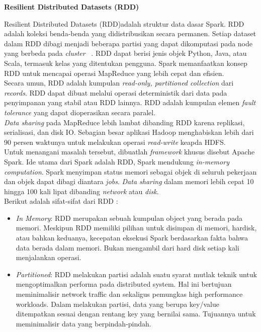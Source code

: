 \documentclass[a4paper,twoside]{article}
\begin{document}
\begin{enumerate}
\begin{itemize}
\end{itemize}

\textbf{Resilient Distributed Datasets (RDD)}

Resilient Distributed Datasets (RDD)adalah struktur data dasar Spark. RDD adalah koleksi benda-benda yang didistribusikan secara permanen. Setiap dataset dalam RDD dibagi menjadi beberapa partisi yang dapat dikomputasi pada node yang berbeda pada \textit{cluster} ~\cite{holdenkarau:02:ls}. RDD dapat berisi jenis objek Python, Java, atau Scala, termasuk kelas yang ditentukan pengguna. Spark memanfaatkan konsep RDD untuk mencapai operasi MapReduce yang lebih cepat dan efisien. \\

Secara umun, RDD adalah kumpulan \textit{read-only, partitioned collection} dari \textit{records}. RDD dapat dibuat melalui operasi deterministik dari data pada penyimpanan yang stabil atau RDD lainnya. RDD adalah kumpulan elemen \textit{fault tolerance} yang dapat dioperasikan secara paralel.\\


\textit{Data sharing} pada MapReduce lebih lambat dibanding RDD  karena replikasi, serialisasi, dan disk IO. Sebagian besar aplikasi Hadoop menghabiskan lebih dari 90 persen waktunya untuk melakukan operasi \textit{read-write} keapda HDFS.\\

Untuk menangani masalah tersebut, dibuatlah \textit{framework} khusus disebut Apache Spark. Ide utama dari Spark adalah RDD, Spark mendukung \textit{in-memory computation}. Spark menyimpan status memori sebagai objek di seluruh pekerjaan dan objek dapat dibagi diantara \textit{jobs}. \textit{Data sharing} dalam memori lebih cepat 10 hingga 100 kali lipat dibanding \textit{network} atau \textit{disk}.\\

Berikut adalah sifat-sifat dari RDD :
\begin{itemize}

\item \textit{In Memory}: RDD merupakan sebuah kumpulan object yang berada pada memori. Meskipun
RDD memiliki pilihan untuk disimpan di memori, hardisk, atau bahkan keduanya, kecepatan
eksekusi Spark berdasarkan fakta bahwa data berada dalam memori. Bukan mengambil dari
hard disk setiap kali menjalankan operasi.

\item \textit{Partitioned}: RDD melakukan partisi adalah suatu syarat mutlak teknik untuk mengoptimalkan
performa pada distributed system. Hal ini bertujuan meminimalisir network traffic dan
sekaligus pemungkas high performance workloads. Dalam melakukan partisi, data yang
berupa key/value ditempatkan sesuai dengan rentang key yang bernilai sama. Tujuannya
untuk meminimalisir data yang berpindah-pindah.


\end{itemize}
\end{enumerate}
\end{document}
